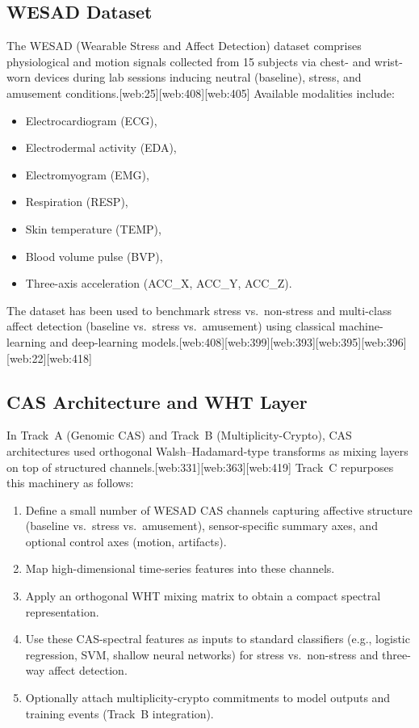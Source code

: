 \documentclass[11pt]{article}
\begin{document}
\subsection{WESAD Dataset}

The WESAD (Wearable Stress and Affect Detection) dataset comprises physiological and motion signals collected from 15 subjects via chest- and wrist-worn devices during lab sessions inducing neutral (baseline), stress, and amusement conditions.\cite{Schmidt2018_WESAD}[web:25][web:408][web:405] Available modalities include:

\begin{itemize}
  \item Electrocardiogram (ECG),
  \item Electrodermal activity (EDA),
  \item Electromyogram (EMG),
  \item Respiration (RESP),
  \item Skin temperature (TEMP),
  \item Blood volume pulse (BVP),
  \item Three-axis acceleration (ACC\_X, ACC\_Y, ACC\_Z).
\end{itemize}

The dataset has been used to benchmark stress vs.\ non-stress and multi-class affect detection (baseline vs.\ stress vs.\ amusement) using classical machine-learning and deep-learning models.\cite{Schmidt2018_WESAD,WESAD_JohnsonGitHub,WESAD_JaganGitHub,WESAD_Siyixu,WESAD_Srovins,WESAD_CrossModality,WESAD_CrossDomain}[web:408][web:399][web:393][web:395][web:396][web:22][web:418]

\subsection{CAS Architecture and WHT Layer}

In Track~A (Genomic CAS) and Track~B (Multiplicity-Crypto), CAS architectures used orthogonal Walsh--Hadamard-type transforms as mixing layers on top of structured channels.\cite{WHTOverview,WHTOrthogonal}[web:331][web:363][web:419] Track~C repurposes this machinery as follows:

\begin{enumerate}
  \item Define a small number of WESAD CAS channels capturing affective structure (baseline vs.\ stress vs.\ amusement), sensor-specific summary axes, and optional control axes (motion, artifacts).
  \item Map high-dimensional time-series features into these channels.
  \item Apply an orthogonal WHT mixing matrix to obtain a compact spectral representation.
  \item Use these CAS-spectral features as inputs to standard classifiers (e.g., logistic regression, SVM, shallow neural networks) for stress vs.\ non-stress and three-way affect detection.
  \item Optionally attach multiplicity-crypto commitments to model outputs and training events (Track~B integration).
\end{enumerate}
\end{document}
